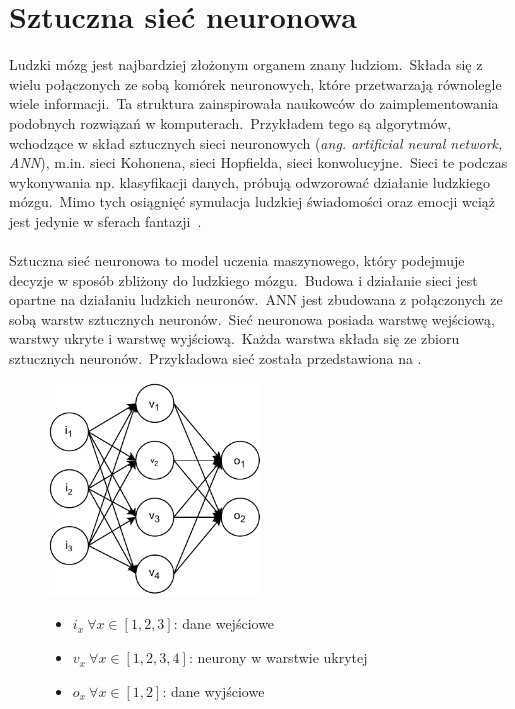 \section{Sztuczna sieć neuronowa}
\label{sec:snn}
Ludzki mózg jest najbardziej złożonym organem znany ludziom.\ Składa się z wielu połączonych ze sobą komórek neuronowych, które przetwarzają równolegle wiele informacji.\ Ta struktura zainspirowała naukowców do zaimplementowania podobnych rozwiązań w komputerach.\ Przykładem tego są algorytmów, wchodzące w skład sztucznych sieci neuronowych (\textit{ang. artificial neural network, ANN}), m.in. sieci Kohonena, sieci Hopfielda, sieci konwolucyjne.\ Sieci te podczas wykonywania np. klasyfikacji danych, próbują odwzorować działanie ludzkiego mózgu.\ Mimo tych osiągnięć symulacja ludzkiej świadomości oraz emocji wciąż jest jedynie w sferach fantazji~\cite{Wang2003}.
\\ \\
Sztuczna sieć neuronowa to model uczenia maszynowego, który podejmuje decyzje w sposób zbliżony do ludzkiego mózgu.\ Budowa i działanie sieci jest opartne na działaniu ludzkich neuronów.\ ANN jest zbudowana z połączonych ze sobą warstw sztucznych neuronów.\ Sieć neuronowa posiada warstwę wejściową, warstwy ukryte i warstwę wyjściową.\ Każda warstwa składa się ze zbioru sztucznych neuronów.\ Przykładowa sieć została przedstawiona na .
\begin{figure}[H]
    \centering
    \includegraphics[width=0.5\textwidth]{images/neural-network}
    \begin{itemize}
        \item[] $i_x \ \forall x \in [1, 2, 3]$: dane wejściowe
        \item[] $v_x \ \forall x \in [1, 2, 3, 4]$: neurony w warstwie ukrytej
        \item[] $o_x \ \forall x \in [1, 2]$: dane wyjściowe
    \end{itemize}
    \label{fig:neural-network}
\end{figure}


